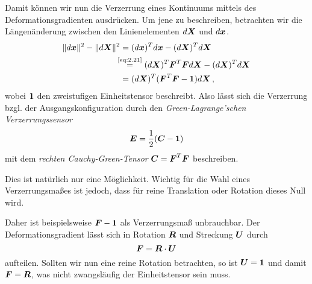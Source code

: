 Damit können wir nun die Verzerrung eines Kontinuums mittels des Deformationsgradienten ausdrücken. Um jene zu beschreiben, betrachten wir die Längenänderung zwischen den Linienelementen $d\boldsymbol X$ und $d\boldsymbol x$.
\begin{align*}
	\lVert d\boldsymbol x\rVert^2-\lVert d\boldsymbol X\rVert^2 &= (d\boldsymbol x)^T d\boldsymbol x - (d\boldsymbol X)^Td\boldsymbol X \\
	& \! \! \!\!\: \!\!\: \stackrel{\scriptsize \eqref{eq:2.21}}= (d\boldsymbol X)^T \boldsymbol F^T \boldsymbol F d\boldsymbol X - (d\boldsymbol X)^Td\boldsymbol X \\
	& = (d\boldsymbol X)^T (\boldsymbol F^T \boldsymbol F- \boldsymbol 1) d\boldsymbol X \, ,
\end{align*}
wobei $\boldsymbol 1$ den zweistufigen Einheitstensor beschreibt. Also lässt sich die Verzerrung bzgl. der Ausgangskonfiguration durch den \textit{Green-Lagrange'schen Verzerrungssensor}
\begin{align}\label{eq:2.24}
	\boldsymbol E = \frac 1 2 (\boldsymbol C- \boldsymbol 1)
\end{align}
mit dem \textit{rechten Cauchy-Green-Tensor} $\boldsymbol C = \boldsymbol F^T\boldsymbol F$ beschreiben.


\begin{bem}
Dies ist natürlich nur eine Möglichkeit. Wichtig für die Wahl eines Verzerrungsmaßes ist jedoch, dass für reine Translation oder Rotation dieses Null wird. 

Daher ist beispielsweise $\boldsymbol F - \boldsymbol 1$ als Verzerrungsmaß unbrauchbar. Der Deformationsgradient lässt sich in Rotation $\boldsymbol R$ und Streckung $\boldsymbol U$ durch $$\boldsymbol F = \boldsymbol R \cdot \boldsymbol U$$ aufteilen. Sollten wir nun eine reine Rotation betrachten, so ist $\boldsymbol U = \boldsymbol 1$ und damit $\boldsymbol F = \boldsymbol R$, was nicht zwangsläufig der Einheitstensor sein muss.
\end{bem}



